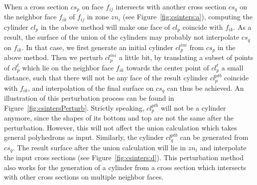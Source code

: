 When a cross section $cs_p$ on face $f_{ij}$  intersects with
another cross section $cs_q$ on the neighbor face $f_{ik}$ of
$f_{ij}$ in zone $zn_i$ (see Figure~\ref{fig:csinters:a}), computing
the cylinder $cl_p$ in the above method will make one face of $cl_p$
coincide with $f_{ik}$. As a result, the surface of the union of the
cylinders may probably not interpolate $cs_q$ on $f_{ik}$. In that
case, we first generate an initial cylinder $cl_p^{ini}$ from $cs_p$
in the above method. Then we perturb $cl_p^{ini}$ a little bit, by
translating a subset of points of $cl_p^t$ which lie on the neighbor
face $f_{ik}$ towards the center point of $cl_p^t$ a small distance,
such that there will not be any face of the result cylinder
$cl_p^{ptb}$ coincide with $f_{ik}$, and interpolation of the final
surface on $cs_q$ can thus be achieved. An illustration of this perturbation
process can be found in Figure~\ref{fig:csintersPerturb}. Strictly speaking,
$cl_p^{ptb}$ will not be a cylinder anymore, since the shapes of its
bottom and top are not the same after the perturbation. However,
this will not affect the union calculation which takes general
polyhedrons as input. Similarly, the cylinder $cl_q^{ptb}$ can be
generated from $cs_q$. The result surface after the union
calculation will lie in $zn_i$ and interpolate the input cross
sections (see Figure~\ref{fig:csinters:d}). This perturbation method
also works for the generation of a cylinder from a cross section
which intersects with other cross sections on multiple neighbor
faces.


